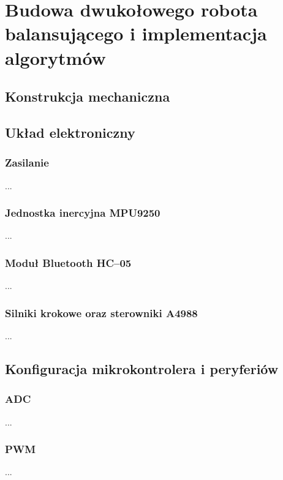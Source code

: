 \chapter{Budowa dwukołowego robota balansującego i implementacja algorytmów}
\label{chap:budowa}

\section{Konstrukcja mechaniczna}

\section{Układ elektroniczny}

\subsection{Zasilanie}
...

\subsection{Jednostka inercyjna MPU9250}
...

\subsection{Moduł Bluetooth HC--05}
...

\subsection{Silniki krokowe oraz sterowniki A4988}
...

\section{Konfiguracja mikrokontrolera i peryferiów}

\subsection{ADC}
...

\subsection{PWM}
...

